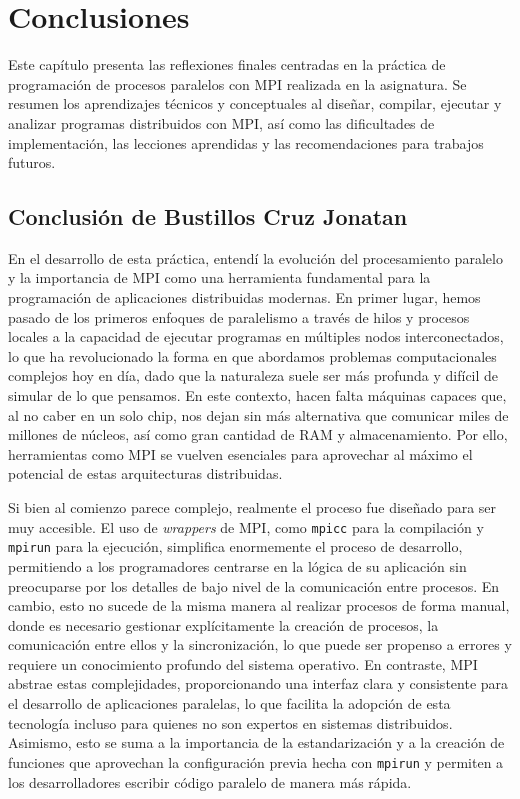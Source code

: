 ﻿%

\chapter{Conclusiones}

Este capítulo presenta las reflexiones finales centradas en la práctica de programación de procesos paralelos con MPI realizada en la asignatura. Se resumen los aprendizajes técnicos y conceptuales al diseñar, compilar, ejecutar y analizar programas distribuidos con MPI, así como las dificultades de implementación, las lecciones aprendidas y las recomendaciones para trabajos futuros.

\newpage
\section{Conclusión de Bustillos Cruz Jonatan}
En el desarrollo de esta práctica, entendí la evolución del procesamiento paralelo y la importancia de MPI como una herramienta fundamental para la programación de aplicaciones distribuidas modernas. En primer lugar, hemos pasado de los primeros enfoques de paralelismo a través de hilos y procesos locales a la capacidad de ejecutar programas en múltiples nodos interconectados, lo que ha revolucionado la forma en que abordamos problemas computacionales complejos hoy en día, dado que la naturaleza suele ser más profunda y difícil de simular de lo que pensamos. En este contexto, hacen falta máquinas capaces que, al no caber en un solo chip, nos dejan sin más alternativa que comunicar miles de millones de núcleos, así como gran cantidad de RAM y almacenamiento. Por ello, herramientas como MPI se vuelven esenciales para aprovechar al máximo el potencial de estas arquitecturas distribuidas. 

Si bien al comienzo parece complejo, realmente el proceso fue diseñado para ser muy accesible. El uso de \textit{wrappers} de MPI, como \texttt{mpicc} para la compilación y \texttt{mpirun} para la ejecución, simplifica enormemente el proceso de desarrollo, permitiendo a los programadores centrarse en la lógica de su aplicación sin preocuparse por los detalles de bajo nivel de la comunicación entre procesos. En cambio, esto no sucede de la misma manera al realizar procesos de forma manual, donde es necesario gestionar explícitamente la creación de procesos, la comunicación entre ellos y la sincronización, lo que puede ser propenso a errores y requiere un conocimiento profundo del sistema operativo. En contraste, MPI abstrae estas complejidades, proporcionando una interfaz clara y consistente para el desarrollo de aplicaciones paralelas, lo que facilita la adopción de esta tecnología incluso para quienes no son expertos en sistemas distribuidos. Asimismo, esto se suma a la importancia de la estandarización y a la creación de funciones que aprovechan la configuración previa hecha con \texttt{mpirun} y permiten a los desarrolladores escribir código paralelo de manera más rápida.

